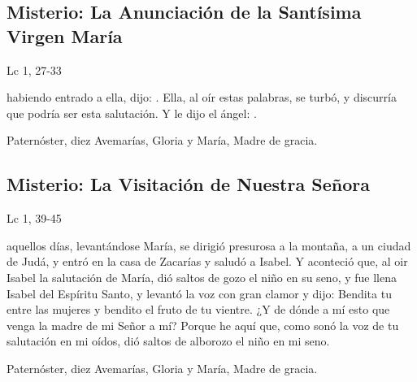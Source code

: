 \documentclass[10pt,a4paper,oneside]{book}
\newcounter{joyful-counter}
\begin{document}
\subsection*{ Misterio: La Anunciación de la Santísima Virgen María}
\begin{flushright}
      {\color{red}Lc 1, 27-33}
\end{flushright}
habiendo entrado a ella, dijo: . Ella, al oír estas palabras, se turbó, 
y discurría que podría ser esta salutación. Y le dijo el ángel: .

\begin{center}
      Paternóster, diez Avemarías, Gloria y María, Madre de gracia.
\end{center}

\subsection*{ Misterio: La Visitación de Nuestra Señora}
\begin{flushright}
      {\color{red}Lc 1, 39-45}
\end{flushright}
 aquellos días, levantándose María, se dirigió presurosa a la montaña, a un ciudad de Judá, y entró en la casa de Zacarías y saludó a Isabel. 
Y aconteció que, al oir Isabel la salutación de María, dió saltos de gozo el niño en su seno, y fue llena Isabel del Espíritu Santo, y levantó la voz con gran clamor y dijo: 
Bendita tu entre las mujeres y bendito el fruto de tu vientre. ¿Y de dónde a mí esto que venga la madre de mi Señor a mí? Porque he aquí que, como sonó la voz de tu salutación en mi oídos, 
dió saltos de alborozo el niño en mi seno.

\begin{center}
      Paternóster, diez Avemarías, Gloria y María, Madre de gracia.
\end{center}

\end{document}
